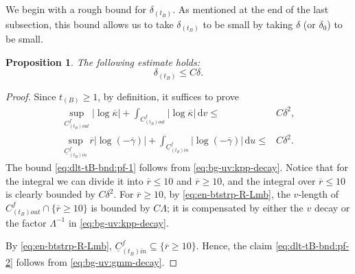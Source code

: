 \documentclass[10pt, reqno]{amsart}
\newtheorem{proposition}[theorem]{Proposition}
\theoremstyle{definition}
\theoremstyle{remark}
\theoremstyle{conjecture}
\numberwithin{equation}{section}
\newcommand{\abs}[1]{\vert#1\vert}
\newcommand{\set}[1]{\{#1\}}
\newcommand{\ud}{\mathrm{d}}
\newcommand{\0}{\emptyset}
\newcommand{\gmm}{\gamma}
\newcommand{\dlt}{\delta}
\newcommand{\kpp}{\kappa}
\newcommand{\lmb}{\lambda}
\newcommand{\Lmb}{\Lambda}
\newcommand{\uC}{\underline{C}}
\newcommand{\dur}{\nu}
\newcommand{\dvr}{\lmb}
\newcommand{\de}{\delta}
\newcommand{\rbg}{\overline{r}}					%
\newcommand{\kppbg}{\overline{\kpp}}					%
\newcommand{\gmmbg}{\overline{\gmm}}					%
\begin{document}
We begin with a rough bound for $\de_{(t_B)}$. As mentioned at the end of the last subsection, this bound allows us to take $\de_{(t_B)}$ to be small by taking $\de$ (or $\de_0$) to be small.
\begin{proposition}\label{prop:dlt-tB-bnd}
The following estimate holds:
\begin{equation*}
\de_{(t_B)}\leq C\de.
\end{equation*}
\end{proposition}
\begin{proof}
Since $t_{(B)}\geq 1$, by definition, it suffices to prove
\begin{align} 
	\sup_{C_{(t_{B}) out}^{f}} \abs{\log \kppbg} + \int_{C_{(t_{B}) out}^{f}} \abs{\log \kppbg} \, \ud v 
\leq & C \dlt^{2} ,		\label{eq:dlt-tB-bnd:pf-1}\\
 	\sup_{\uC_{(t_{B}) in}^{f}} \rbg \abs{\log (-\gmmbg)} + \int_{\uC_{(t_{B}) in}^{f}} \abs{\log (-\gmmbg)} \, \ud u
\leq & C \dlt^{2} .		\label{eq:dlt-tB-bnd:pf-2} 
\end{align}
The bound \eqref{eq:dlt-tB-bnd:pf-1} follows from \eqref{eq:bg-uv:kpp-decay}. Notice that for the integral we can divide it into $\rbg\leq 10$ and $\rbg\geq 10$, and the integral over $\rbg\leq 10$ is clearly bounded by $C \dlt^2$. For $\rbg\geq 10$, by \eqref{eq:en-btstrp-R-Lmb}, the $v$-length of $C^{f}_{(t_{B}) out} \cap \set{\rbg \geq 10}$ is bounded by $C \Lmb$; it is compensated by either the $v$ decay or the factor $\Lmb^{-1}$ in \eqref{eq:bg-uv:kpp-decay}. 

By \eqref{eq:en-btstrp-R-Lmb}, $\uC_{(t_{B}) in}^{f} \subseteq \{\rbg \geq 10\}$. Hence, the claim \eqref{eq:dlt-tB-bnd:pf-2} follows from \eqref{eq:bg-uv:gmm-decay}. \qedhere
\end{proof}
\end{document}
